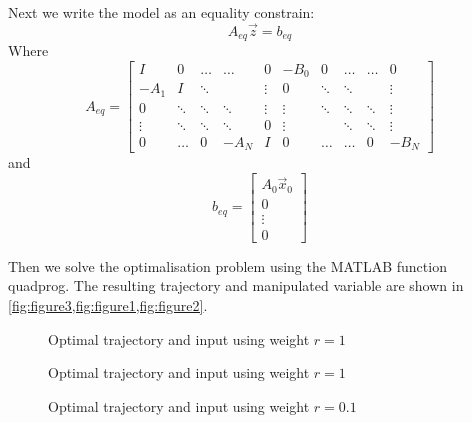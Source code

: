 \documentclass[11pt, a4paper, USenglish]{article} %
\begin{document}
Next we write the model as an equality constrain:
\begin{equation}\label{eq:equality_constrains}
A_{eq}\vec{z}=b_{eq}
\end{equation}
Where $$A_{eq}= 
\left[
\begin{array}{ccccc|ccccc}
I & 0 & \dots & \dots & 0  &-B_0 &0&\dots&\dots&0\\
-A_1 & I &\ddots& & \vdots  &0 &\ddots&\ddots&&\vdots\\
0 &\ddots&\ddots&\ddots&\vdots  &\vdots &\ddots&\ddots&\ddots&\vdots\\
\vdots &\ddots&\ddots&\ddots&0&\vdots&&\ddots&\ddots&\vdots\\
0 &\dots&0&-A_N&I  & 0 &\dots&\dots&0&-B_N
\end{array}
\right]$$
and
\begin{equation*}
b_{eq} = \begin{bmatrix} A_0 \vec{x}_0 \\ 0 \\ \vdots \\ 0\end{bmatrix}
\end{equation*}

Then we solve the optimalisation problem using the MATLAB function quadprog. The resulting trajectory and manipulated variable are shown in \cref{fig:figure3,fig:figure1,fig:figure2}.

\begin{figure}[H] 
        \centering
        \setlength{\figureheight}{6cm}
        \setlength{\figurewidth}{10cm}
        
        \caption{Optimal trajectory and input using weight $r=1$} 
\label{fig:figure3} 
\end{figure}

\begin{figure}[H] 
        \centering
        \setlength{\figureheight}{6cm}
        \setlength{\figurewidth}{10cm}
        
        \caption{Optimal trajectory and input using weight $r=1$} 
\label{fig:figure1}
\end{figure}

\begin{figure}[H] 
        \centering
        \setlength{\figureheight}{6cm}
        \setlength{\figurewidth}{10cm}
        
        \caption{Optimal trajectory and input using weight $r=0.1$} 
\label{fig:figure2} 
\end{figure}
\end{document}
